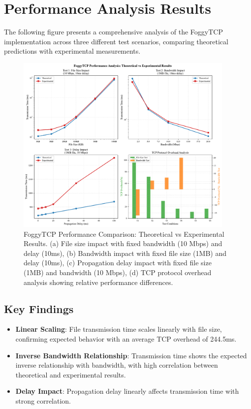 \documentclass[11pt,letterpaper]{article}
\begin{document}
\section{Performance Analysis Results}

The following figure presents a comprehensive analysis of the FoggyTCP implementation across three different test scenarios, 
 comparing theoretical predictions with experimental measurements.

\begin{figure}[H]
    \centering
    \includegraphics[width=0.95\textwidth]{foggytcp_performance_analysis.pdf}
    \caption{FoggyTCP Performance Comparison: Theoretical vs Experimental Results. 
    (a) File size impact with fixed bandwidth (10 Mbps) and delay (10ms), 
    (b) Bandwidth impact with fixed file size (1MB) and delay (10ms), 
    (c) Propagation delay impact with fixed file size (1MB) and bandwidth (10 Mbps), 
    (d) TCP protocol overhead analysis showing relative performance differences.}
    \label{fig:foggytcp_analysis}
\end{figure}

\subsection{Key Findings}

\begin{itemize}
    \item \textbf{Linear Scaling}:
    File transmission time scales linearly with file size,
    confirming expected behavior with an average TCP overhead of 244.5ms.
    
    \item \textbf{Inverse Bandwidth Relationship}:
    Transmission time shows the expected inverse relationship with bandwidth,
    with high correlation between theoretical and experimental results.
    
    \item \textbf{Delay Impact}:
    Propagation delay linearly affects transmission time with strong correlation.
    
\end{itemize}
\end{document}

